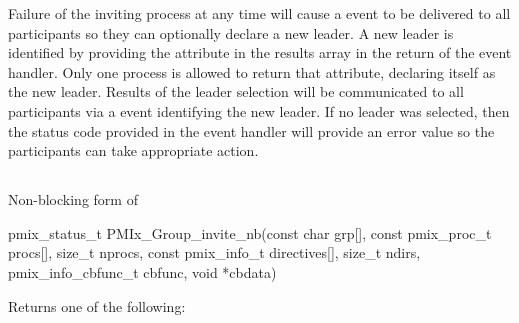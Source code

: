 Failure of the inviting process at any time will cause a  event to be delivered to all participants so they can optionally declare a new leader. A new leader is identified by providing the  attribute in the results array in the return of the event handler. Only one process is allowed to return that attribute, declaring itself as the new leader. Results of the leader selection will be communicated to all participants via a  event identifying the new leader. If no leader was selected, then the status code provided in the event handler will provide an error value so the participants can take appropriate action.


\subsection{}

\summary

Non-blocking form of 

\format

\cspecificstart
\begin{codepar}
pmix_status_t
PMIx_Group_invite_nb(const char grp[],
                     const pmix_proc_t procs[], size_t nprocs,
                     const pmix_info_t directives[], size_t ndirs,
                     pmix_info_cbfunc_t cbfunc, void *cbdata)
\end{codepar}
\cspecificend

\begin{arglist}
\end{arglist}

Returns one of the following:


